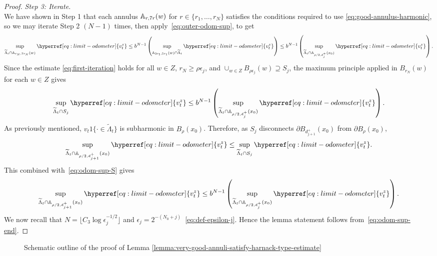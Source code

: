 \documentclass[12pt]{amsart}
\numberwithin{equation}{section}
\newcommand{\odometer}[2]{\hyperref[eq:limit-odometer]{v^{#1}_{#2}}}
\begin{document}
\begin{proof}
		
		{\it Step 3: Iterate. } \\
		We have shown in Step 1 that each annulus $\mathbb{A}_{r, 7 r}(w)$ for $r \in \{r_1, \ldots, r_N\}$ satisfies the conditions required to use \eqref{eq:good-annulus-harmonic}, so we may iterate Step 2 $(N-1)$ times, then apply~\eqref{eq:outer-odom-sup}, to get
		\begin{equation} \label{eq:first-iteration}
		\sup_{\widetilde \Lambda_t \cap \A_{r_N, 7 r_N}(w)} \odometer{z}{t} 
		\leq b^{N-1}  \left( \sup_{  \A_{3 r_1, 5 r_1}(w)  \cap \widetilde \Lambda_t} \odometer{z}{t} \right) 
		\leq b^{N-1} \left( \sup_{\widetilde \Lambda_t \cap \A_{\rho/2, d^+_j}(x_0)} \odometer{z}{t} \right).
		\end{equation}
		Since the estimate \eqref{eq:first-iteration} holds for all $w\in Z$, $r_N \geq \rho \epsilon_j$, and $\cup_{w\in Z} B_{\rho \epsilon_j}(w ) \supseteq S_j$, the maximum principle applied in $B_{r_N}(w)$ for each $w\in Z$ gives
		\begin{equation} \label{eq:odom-sup-S}
		\sup_{\widetilde \Lambda_t \cap S_j} \odometer{z}{t}  \leq b^{N-1} \left( \sup_{\widetilde \Lambda_t \cap \A_{\rho/2, d^+_j}(x_0)} \odometer{z}{t}  \right).
		\end{equation}
		As previously mentioned, $v_t 1\{ \cdot \in \widetilde \Lambda_t\}$ is subharmonic in $B_{\rho}(x_0)$. 
		Therefore, as $S_j$ disconnects $\partial B_{d^+_{j+1}}(x_0)$ from $\partial B_{\rho}(x_0)$, 
		\[
		\sup_{\widetilde \Lambda_t \cap \A_{\rho/2, d^+_{j+1}}(x_0)} \odometer{z}{t} \leq \sup_{\widetilde \Lambda_t \cap S_j} \odometer{z}{t}.
		\]
		This combined with~\eqref{eq:odom-sup-S} gives
		\begin{equation} \label{eq:odom-sup-end}
		\sup_{\widetilde \Lambda_t \cap \A_{\rho/2, d^+_{j+1}}(x_0)} \odometer{z}{t} \leq b^{N-1} \left( \sup_{\widetilde \Lambda_t \cap \A_{\rho/2, d^+_j}(x_0)} \odometer{z}{t}  \right) .
		\end{equation} 
		We now recall that $N = \lfloor C_3 \log \epsilon_j^{-1/2} \rfloor$ and $\epsilon_j = 2^{-(N_0 + j)}$~\eqref{eq:def-epsilon-j}. Hence the lemma statement follows from~\eqref{eq:odom-sup-end}.
	\end{proof}
	
	\begin{figure}
		\begin{center}
			
		\end{center}
		\caption{Schematic outline of the proof of Lemma \ref{lemma:very-good-annuli-satisfy-harnack-type-estimate}}
	\end{figure}
	
\end{document}

